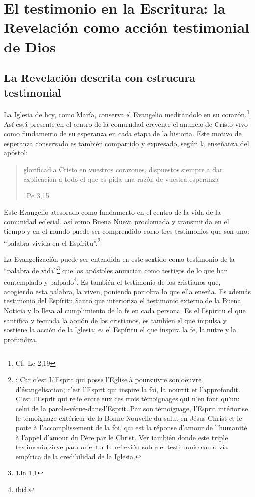 \section{El testimonio en la Escritura: la Revelación como acción testimonial de Dios}

\subsection{La Revelación descrita con estrucura testimonial}

La Iglesia de hoy, como María, conserva el Evangelio meditándolo en su
corazón.\footnote{Cf.~Lc 2,19} Así está presente en el centro de la comunidad
creyente el anuncio de Cristo vivo como fundamento de su esperanza en cada etapa
de la historia. Este motivo de esperanza conservado es también compartido y
expresado, según la enseñanza del apóstol:
\blockquote[1Pe 3,15]{glorificad a Cristo en vuestros corazones, dispuestos
  siempre a dar explicación a todo el que os pida una razón de vuestra
  esperanza}.

Este Evangelio atesorado como fundamento en el centro de la vida de la comunidad
eclesial, así como Buena Nueva proclamada y transmitida en el tiempo y en el
mundo puede ser comprendido como tres testimonios que son uno: \enquote{palabra
  vivida en el Espíritu}.\footnote{\cite[Cf.~][110]{latourelle1975et}: Car c'est
  L'Esprit qui posse l'Eglise à poursuivre son oeuvre d'évangelisation; c'est
  l'Esprit qui inspire la foi, la nourrit et l'approfondit. C'est l'Esprit qui
  relie entre eux ces trois témoignages qui n'en font qu'un: celui de la
  parole-vécue-dans-l'Esprit. Par son témoignage, l'Esprit intériorise le
  témoignage extérieur de la Bonne Nouvelle du salut en Jésus-Christ et le porte
  à l'accomplissement de la foi, qui est la réponse d'amour de l'humanité à
  l'appel d'amour du Père par le Christ. Ver también \cite[582]{ninot2009tf}
  donde este triple testimonio sirve para orientar la reflexión sobre el
  testimonio como vía empírica de la credibilidad de la Iglesia.}

La Evangelización puede ser entendida en este sentido como testimonio de la
\enquote{palabra de vida}\footnote{1Jn 1,1} que los apóstoles anuncian como
testigos de lo que han contemplado y palpado\footnote{ibíd.}. Es también el
testimonio de los cristianos que, acogiendo esta palabra, la viven, poniendo por
obra lo que ella enseña. Es además testimonio del Espíritu Santo que interioriza
el testimonio externo de la Buena Noticia y lo lleva al cumplimiento de la fe en
cada persona.\autocite[Cf.~][110]{latourelle1975et} Es el Espíritu el que
santifica y fecunda la acción de los cristianos, es tambíen el que impulsa y
sostiene la acción de la Iglesia; es el Espíritu el que inspira la fe, la nutre
y la profundiza.\autocite[Cf.~][110]{latourelle1975et}

